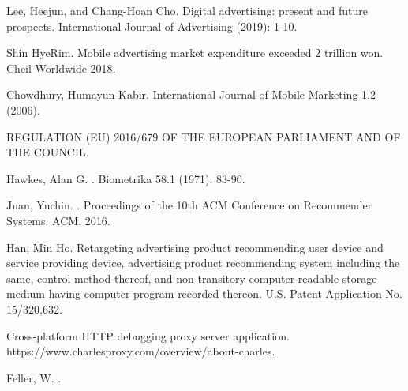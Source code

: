 \documentclass[10pt,letterpaper]{article}
\begin{document}
%
%
% 
\begin{thebibliography}{10}


Lee, Heejun, and Chang-Hoan Cho.
\newblock Digital advertising: present and future prospects.
\newblock International Journal of Advertising (2019): 1-10.

Shin HyeRim.
\newblock Mobile advertising market expenditure exceeded 2 trillion won.
\newblock Cheil Worldwide 2018.

Chowdhury, Humayun Kabir.
\newblock International Journal of Mobile Marketing 1.2 (2006).

\newblock REGULATION (EU) 2016/679 OF THE EUROPEAN PARLIAMENT AND OF THE COUNCIL.

Hawkes, Alan G.
.
\newblock Biometrika 58.1 (1971): 83-90.

Juan, Yuchin.
.
\newblock Proceedings of the 10th ACM Conference on Recommender Systems. ACM, 2016.

Han, Min Ho.
\newblock Retargeting advertising product recommending user device and service providing device, advertising product recommending system including the same, control method thereof, and non-transitory computer readable storage medium having computer program recorded thereon.
\newblock U.S. Patent Application No. 15/320,632.

Cross-platform HTTP debugging proxy server application. https://www.charlesproxy.com/overview/about-charles.

Feller, W. 
.


\end{thebibliography}
\end{document}
